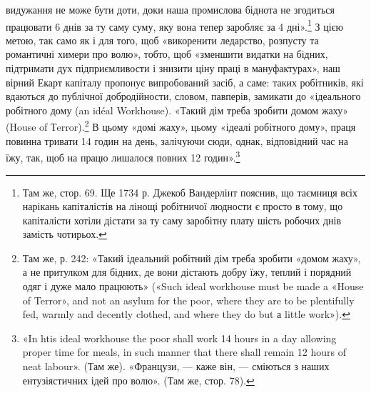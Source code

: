 видужання не може бути доти, доки наша промислова біднота не
згодиться працювати 6 днів за ту саму суму, яку вона тепер заробляє
за 4 дні».\footnote{
Там же, стор. 69. Ще 1734 р. Джекоб Вандерлінт пояснив, що таємниця
всіх нарікань капіталістів на лінощі робітничої людности є просто
в тому, що капіталісти хотіли дістати за ту саму заробітну плату шість
робочих днів замість чотирьох.
} З цією метою, так само як і для того, щоб
«викоренити ледарство, розпусту та романтичні химери про волю»,
тобто, щоб «зменшити видатки на бідних, підтримати дух підприємливости
і знизити ціну праці в мануфактурах», наш вірний
Екарт капіталу пропонує випробований засіб, а саме: таких
робітників, які вдаються до публічної добродійности, словом,
павперів, замикати до «ідеального робітного дому (an idéal Workhouse).
«Такий дім треба зробити домом жаху» (House of Тerror).\footnote{
Там же, р. 242: «Такий ідеальний робітний дім треба зробити «домом
жаху», а не притулком для бідних, де вони дістають добру їжу, теплий
і порядний одяг і дуже мало працюють» («Such ideal workhouse must be
made a «House of Terror», and not an asylum for the poor, where they are
to be plentifully fed, warmly and decently clothed, and where they do but
а little work»).
}
В цьому «домі жаху», цьому «ідеалі робітного дому», праця повинна
тривати 14 годин на день, залічуючи сюди, однак, відповідний час
на їжу, так, щоб на працю лишалося повних 12 годин».\footnote{
«In htis ideal workhouse the poor shall work 14 hours in a day
allowing proper time for meals, in such manner that there shall remain
12 hours of neat labour». (Там же). «Французи, — каже він, — сміються
з наших ентузіястичних ідей про волю». (Там же, стор. 78).
}

